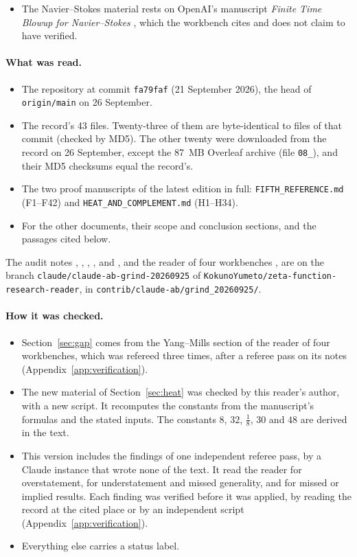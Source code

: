 \begin{itemize}
\item The Navier--Stokes material rests on OpenAI's manuscript \emph{Finite Time Blowup for Navier--Stokes} \cite{OpenAINS}, which the workbench cites and does not claim to have verified.
\end{itemize}

\paragraph{What was read.}
\begin{itemize}
\item The repository at commit \texttt{fa79faf} (21 September 2026), the head of \texttt{origin/main} on 26 September.
\item The record's 43 files. Twenty-three of them are byte-identical to files of that commit (checked by MD5). The other twenty were downloaded from the record on 26 September, except the 87~MB Overleaf archive (file \texttt{08\_}), and their MD5 checksums equal the record's.
\item The two proof manuscripts of the latest edition in full: \texttt{FIFTH\_REFERENCE.md} (F1--F42) and \texttt{HEAT\_AND\_COMPLEMENT.md} (H1--H34).
\item For the other documents, their scope and conclusion sections, and the passages cited below.
\end{itemize}
The audit notes , , , ,  and , and the reader of four workbenches \cite{WorkbenchReader}, are on the branch \texttt{claude/claude-ab-grind-20260925} of \texttt{KokunoYumeto/zeta-function-research-reader}, in \texttt{contrib/claude-ab/grind\_20260925/}.

\paragraph{How it was checked.}
\begin{itemize}
\item Section~\ref{sec:gap} comes from the Yang--Mills section of the reader of four workbenches, which was refereed three times, after a referee pass on its notes (Appendix~\ref{app:verification}).
\item The new material of Section~\ref{sec:heat} was checked by this reader's author, with a new script. It recomputes the constants from the manuscript's formulas and the stated inputs. The constants $8$, $32$, $\frac18$, $30$ and $48$ are derived in the text.
\item This version includes the findings of one independent referee pass, by a Claude instance that wrote none of the text. It read the reader for overstatement, for understatement and missed generality, and for missed or implied results. Each finding was verified before it was applied, by reading the record at the cited place or by an independent script (Appendix~\ref{app:verification}).
\item Everything else carries a status label.
\end{itemize}

